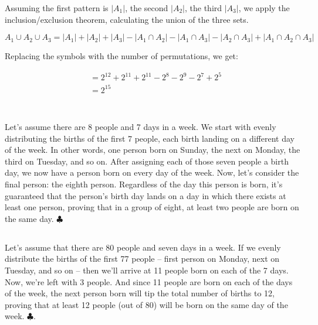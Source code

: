 \documentclass{article}
\begin{document}
Assuming the first pattern is $|A_1|$, the second $|A_2|$, the third $|A_3|$, we apply the inclusion/exclusion theorem, calculating the union of the three sets.

$A_1 \cup A_2 \cup A_3 = |A_1| + |A_2| + |A_3| - |A_1 \cap A_2| - |A_1 \cap A_3| - |A_2 \cap A_3| + |A_1 \cap A_2 \cap A_3|$

Replacing the symbols with the number of permutations, we get:

\begin{align*}
   &= 2^{12} + 2^{11} + 2^{11} - 2^8 - 2^9 - 2^7 + 2^5 \\
   &= 2^{15} \\
\end{align*}




\section{}

\subsection{}

Let's assume there are 8 people and 7 days in a week. We start with evenly distributing the births of the first 7 people, each birth landing on a different day of the week. In other words, one person born on Sunday, the next on Monday, the third on Tuesday, and so on. After assigning each of those seven people a birth day, we now have a person born on every day of the week. Now, let's consider the final person: the eighth person. Regardless of the day this person is born, it's guaranteed that the person's birth day lands on a day in which there exists at least one person, proving that in a group of eight, at least two people are born on the same day. $\clubsuit$

\subsection{}

Let's assume that there are 80 people and seven days in a week. If we evenly distribute the births of the first 77 people -- first person on Monday, next on Tuesday, and so on -- then we'll arrive at 11 people born on each of the 7 days. Now, we're left with 3 people. And since 11 people are born on each of the days of the week, the next person born will tip the total number of births to 12, proving that at least 12 people (out of 80) will be born on the same day of the week. $\clubsuit$.
\end{document}
